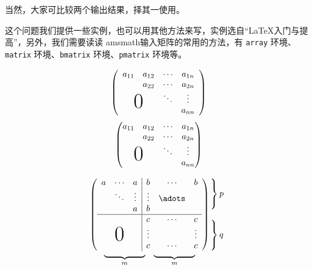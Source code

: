 当然，大家可比较两个输出结果，择其一使用。

这个问题我们提供一些实例，也可以用其他方法来写，实例选自``\LaTeX{}入门与提高''，另外，我们需要读读
amsmath输入矩阵的常用的方法，有 \verb|array| 环境、\verb|matrix| 环境、\verb|bmatrix| 环境、\verb|pmatrix| 环境等。
\begin{example}
\[\left(\begin{array}{cccc}
  a_{11} & a_{12} & \cdots & a_{1n} \\
  &a_{22}  & \cdots &a_{2n}  \\
  &        & \ddots & \vdots \\
  \multicolumn{2}{c}{\raisebox{1.3ex}[0pt]{\Huge0}}
  &        &a_{nn}
\end{array}\right)\]
\[\begin{pmatrix}
  a_{11} & a_{12} & \cdots & a_{1n} \\
  &a_{22}  & \cdots &a_{2n}  \\
  &        & \ddots & \vdots \\
  \multicolumn{2}{c}{\raisebox{1.3ex}[0pt]{\Huge0}}
  &        &a_{nn}
\end{pmatrix}\]
\end{example}
\begin{example}
\[
 \begin{array}{c@{\hspace{-5pt}}l}
  \left(\begin{array}{ccc|ccc}
   a&\cdots &a &b &\cdots&b\\
   &\ddots &\vdots &\vdots &\adots\\
   & &a& b \\\hline
   & & & c &\cdots &c\\
   & & & \vdots& &\vdots\\
   \multicolumn{3}{c|}{\raisebox{2ex}[0pt]{\Huge0}}
   & c & \cdots & c
  \end{array}\right)
  &\begin{array}{l}
    \left.\rule{0mm}{7mm}\right\}p\\
	\\\left.\rule{0mm}{7mm}\right\}q
   \end{array}\\[-5pt]
  \begin{array}{cc}
   \underbrace{\rule{17mm}{0mm}}_m&
   \underbrace{\rule{17mm}{0mm}}_m
  \end{array}&
 \end{array}
\]
\end{example}
